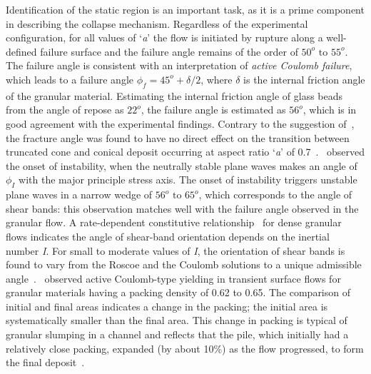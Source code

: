 Identification of the static region is an important task, as it is a prime 
component in describing the collapse mechanism. Regardless of the experimental 
configuration, for all values of `\textit{a}' the flow is initiated by rupture 
along a well-defined failure surface and the failure angle remains of the order 
of $50^{o} \mbox{ to } 55^{o}$. The failure angle is consistent with an 
interpretation of \textit{active Coulomb failure}, which leads to a failure 
angle $\phi_{\textit{f}}=45^{o}+\delta / 2$, where $\delta$ is the internal 
friction angle of the granular material. Estimating the internal friction angle 
of glass beads from the angle of repose as $22^{o}$, the failure angle is 
estimated as $56^{o}$, which is in good agreement with the experimental 
findings. Contrary to the suggestion of~\citet{Lajeunesse2004}, the fracture 
angle was found to have no direct effect on the transition between truncated 
cone and conical deposit occurring at aspect ratio `\textit{a}' of 
0.7~\citep{Lajeunesse2005}.~\citet{Schaefer1990} observed the onset of 
instability, when the neutrally stable plane waves makes an angle of 
$\phi_{\textit{I}}$ with the major principle stress axis. The onset of 
instability triggers unstable plane waves in a narrow wedge of $56^{o}\mbox{ to 
}65^{o}$, which corresponds to the angle of shear bands: this observation 
matches well with the failure angle observed in the granular flow. A 
rate-dependent constitutive relationship~\citep{Jop2006} for dense granular 
flows indicates the angle of shear-band orientation depends on the inertial 
number \textit{I}. For small to moderate values of \textit{I}, the orientation 
of shear bands is found to vary from the Roscoe and the Coulomb solutions to a 
unique admissible angle~\citep{Lemiale2011}.~\citet{Daerr1999} observed active 
Coulomb-type yielding in transient surface flows for granular materials having 
a packing density of 0.62 to 0.65. The comparison of initial and final areas 
indicates a change in the packing; the initial area is systematically smaller 
than the final area. This change in packing is typical of granular slumping in 
a channel and reflects that the pile, which initially had a relatively close 
packing, expanded (by about 10\%) as the flow progressed, to form the final 
deposit~\citep{Balmforth2005}.

